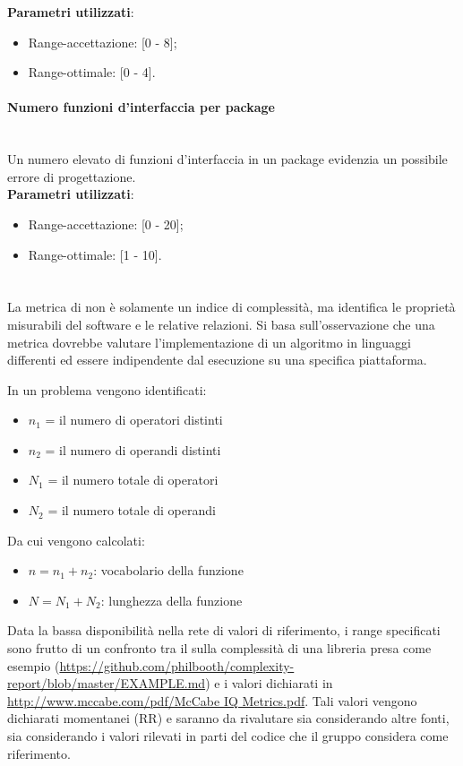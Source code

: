 			\textbf{Parametri utilizzati}:
			\begin{itemize}
				\item Range-accettazione: [0 - 8];
				\item Range-ottimale: [0 - 4].
			\end{itemize}
			
			
			\paragraph{Numero funzioni d'interfaccia per package}\mbox{} \\
				
			Un numero elevato di funzioni d'interfaccia in un package evidenzia un possibile errore di progettazione.\\
			\textbf{Parametri utilizzati}:
			\begin{itemize}
				\item Range-accettazione: [0 - 20];
				\item Range-ottimale: [1 - 10].
			\end{itemize}

			
			\paragraph{}\mbox{} \\
			
			La metrica di  non è solamente un indice di complessità, ma identifica le proprietà misurabili del software e le relative relazioni. Si basa sull'osservazione che una metrica dovrebbe valutare l'implementazione di un algoritmo in linguaggi differenti ed essere indipendente dal esecuzione su una specifica piattaforma.

			In un problema vengono identificati:
			\begin{itemize}
				\item $n_1$ = il numero di operatori distinti
				\item $n_2$ = il numero di operandi distinti
				\item $N_1$ = il numero totale di operatori
				\item $N_2$ = il numero totale di operandi
			\end{itemize}
			Da cui vengono calcolati:
				\begin{itemize}
				\item $n = n_1 + n_2$: vocabolario della funzione
				\item $N = N_1 + N_2$: lunghezza della funzione
			\end{itemize}
			Data la bassa disponibilità nella rete di valori di riferimento, i range specificati sono frutto di un confronto tra il  sulla complessità di una libreria  presa come esempio (\url{https://github.com/philbooth/complexity-report/blob/master/EXAMPLE.md}) e i valori dichiarati in \url{http://www.mccabe.com/pdf/McCabe IQ Metrics.pdf}. Tali valori vengono dichiarati momentanei (RR) e saranno da rivalutare sia considerando altre fonti, sia considerando i valori rilevati in parti del codice che il gruppo considera come riferimento. %

